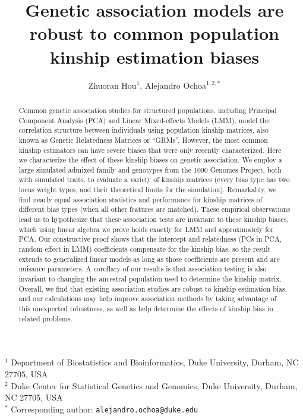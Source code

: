\documentclass[11pt]{article}
\title{\Large \textbf{Genetic association models are robust to common population kinship estimation biases}}
\author{Zhuoran Hou$^1$, Alejandro Ochoa$^{1,2,*}$}
\date{}
\begin{document}
\maketitle

\noindent
$^1$ Department of Biostatistics and Bioinformatics, Duke University, Durham, NC 27705, USA \\
$^2$ Duke Center for Statistical Genetics and Genomics, Duke University, Durham, NC 27705, USA \\
$^*$ Corresponding author: \texttt{alejandro.ochoa@duke.edu}


\begin{abstract}
  Common genetic association studies for structured populations, including Principal Component Analysis (PCA) and Linear Mixed-effects Models (LMM), model the correlation structure between individuals using population kinship matrices, also known as Genetic Relatedness Matrices or ``GRMs''.
  However, the most common kinship estimators can have severe biases that were only recently characterized.
  Here we characterize the effect of these kinship biases on genetic association.
  We employ a large simulated admixed family and genotypes from the 1000 Genomes Project, both with simulated traits, to evaluate a variety of kinship matrices (every bias type has two locus weight types, and their theoretical limits for the simulation).
  Remarkably, we find nearly equal association statistics and performance for kinship matrices of different bias types (when all other features are matched).
  These empirical observations lead us to hypothesize that these association tests are invariant to these kinship biases, which using linear algebra we prove holds exactly for LMM and approximately for PCA.
  Our constructive proof shows that the intercept and relatedness (PCs in PCA, random effect in LMM) coefficients compensate for the kinship bias, so the result extends to generalized linear models as long as those coefficients are present and are nuisance parameters.
  A corollary of our results is that association testing is also invariant to changing the ancestral population used to determine the kinship matrix.
  Overall, we find that existing association studies are robust to kinship estimation bias, and our calculations may help improve association methods by taking advantage of this unexpected robustness, as well as help determine the effects of kinship bias in related problems.
\end{abstract}
\end{document}
